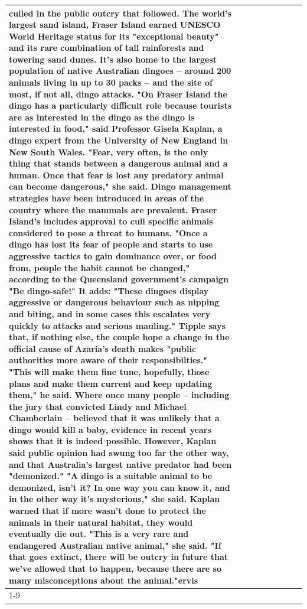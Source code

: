 \begin{table}[H]
\begin{tabular}{lllrlllll}
culled in the public outcry that followed. The world's largest sand island, Fraser Island earned UNESCO World Heritage status for its "exceptional beauty" and its rare combination of tall rainforests and towering sand dunes. It's also home to the largest population of native Australian dingoes -- around 200 animals living in up to 30 packs -- and the site of most, if not all, dingo attacks. "On Fraser Island the dingo has a particularly difficult role because tourists are as interested in the dingo as the dingo is interested in food," said Professor Gisela Kaplan, a dingo expert from the University of New England in New South Wales. "Fear, very often, is the only thing that stands between a dangerous animal and a human. Once that fear is lost any predatory animal can become dangerous," she said. Dingo management strategies have been introduced in areas of the country where the mammals are prevalent. Fraser Island's includes approval to cull specific animals considered to pose a threat to humans. "Once a dingo has lost its fear of people and starts to use aggressive tactics to gain dominance over, or food from, people the habit cannot be changed," according to the Queensland government's campaign "Be dingo-safe!" It adds: "These dingoes display aggressive or dangerous behaviour such as nipping and biting, and in some cases this escalates very quickly to attacks and serious mauling." Tipple says that, if nothing else, the couple hope a change in the official cause of Azaria's death makes "public authorities more aware of their responsibilties." "This will make them fine tune, hopefully, those plans and make them current and keep updating them," he said. Where once many people -- including the jury that convicted Lindy and Michael Chamberlain -- believed that it was unlikely that a dingo would kill a baby, evidence in recent years shows that it is indeed possible. However, Kaplan said public opinion had swung too far the other way, and that Australia's largest native predator had been "demonized." "A dingo is a suitable animal to be demonized, isn't it? In one way you can know it, and in the other way it's mysterious," she said. Kaplan warned that if more wasn't done to protect the animals in their natural habitat, they would eventually die out. "This is a very rare and endangered Australian native animal," she said. "If that goes extinct, there will be outcry in future that we've allowed that to happen, because there are so many misconceptions about the animal."ervis \\
\cline{1-9}

\end{tabular}
\end{table}
